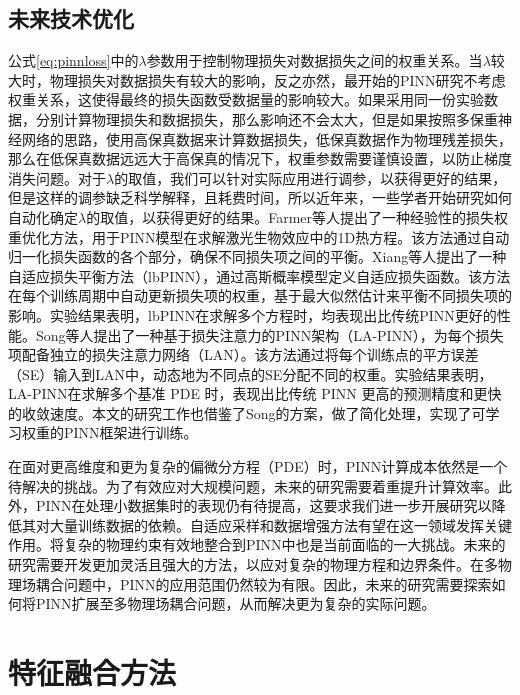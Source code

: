 \subsection{未来技术优化}
公式\eqref{eq:pinnloss}中的$\lambda$参数用于控制物理损失对数据损失之间的权重关系。当$\lambda$较大时，物理损失对数据损失有较大的影响，反之亦然，最开始的PINN研究不考虑权重关系，这使得最终的损失函数受数据量的影响较大。如果采用同一份实验数据，分别计算物理损失和数据损失，那么影响还不会太大，但是如果按照多保重神经网络的思路，使用高保真数据来计算数据损失，低保真数据作为物理残差损失，那么在低保真数据远远大于高保真的情况下，权重参数需要谨慎设置，以防止梯度消失问题\cite{luDeepXDEDeepLearning2021}。对于$\lambda$的取值，我们可以针对实际应用进行调参，以获得更好的结果，但是这样的调参缺乏科学解释，且耗费时间，所以近年来，一些学者开始研究如何自动化确定$\lambda$的取值，以获得更好的结果。Farmer等人提出了一种经验性的损失权重优化方法，用于PINN模型在求解激光生物效应中的1D热方程\cite{farmerEmpiricalLossWeight2024}。该方法通过自动归一化损失函数的各个部分，确保不同损失项之间的平衡。Xiang等人提出了一种自适应损失平衡方法（lbPINN），通过高斯概率模型定义自适应损失函数\cite{xiangSelfadaptiveLossBalanced2022}。该方法在每个训练周期中自动更新损失项的权重，基于最大似然估计来平衡不同损失项的影响。实验结果表明，lbPINN在求解多个方程时，均表现出比传统PINN更好的性能。Song等人提出了一种基于损失注意力的PINN架构（LA-PINN），为每个损失项配备独立的损失注意力网络（LAN）\cite{songLossattentionalPhysicsinformedNeural2024}。该方法通过将每个训练点的平方误差（SE）输入到LAN中，动态地为不同点的SE分配不同的权重。实验结果表明，LA-PINN在求解多个基准 PDE 时，表现出比传统 PINN 更高的预测精度和更快的收敛速度。本文的研究工作也借鉴了Song的方案，做了简化处理，实现了可学习权重的PINN框架进行训练。

在面对更高维度和更为复杂的偏微分方程（PDE）时，PINN计算成本依然是一个待解决的挑战。为了有效应对大规模问题，未来的研究需要着重提升计算效率\cite{Shah2024BenchmarkingQA-PINN}。此外，PINN在处理小数据集时的表现仍有待提高，这要求我们进一步开展研究以降低其对大量训练数据的依赖。自适应采样和数据增强方法有望在这一领域发挥关键作用。将复杂的物理约束有效地整合到PINN中也是当前面临的一大挑战。未来的研究需要开发更加灵活且强大的方法，以应对复杂的物理方程和边界条件。在多物理场耦合问题中，PINN的应用范围仍然较为有限\cite{Hillebrecht2022Certified,Haitsiukevich2023Improved}。因此，未来的研究需要探索如何将PINN扩展至多物理场耦合问题，从而解决更为复杂的实际问题。

\section{特征融合方法}
